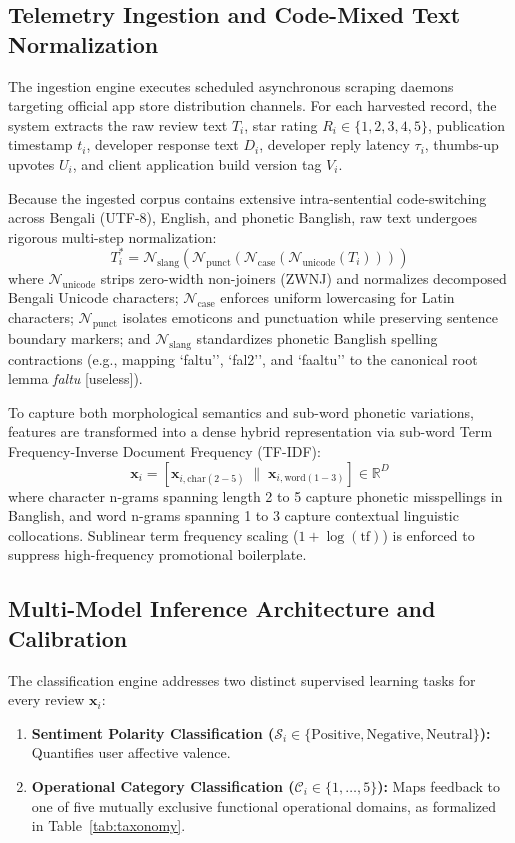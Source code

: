 \documentclass[5p,twocolumn,authoryear]{elsarticle}
\begin{document}
\subsection{Telemetry Ingestion and Code-Mixed Text Normalization}
The ingestion engine executes scheduled asynchronous scraping daemons targeting official app store distribution channels. For each harvested record, the system extracts the raw review text $T_i$, star rating $R_i \in \{1, 2, 3, 4, 5\}$, publication timestamp $t_i$, developer response text $D_i$, developer reply latency $\tau_i$, thumbs-up upvotes $U_i$, and client application build version tag $V_i$.

Because the ingested corpus contains extensive intra-sentential code-switching across Bengali (UTF-8), English, and phonetic Banglish, raw text undergoes rigorous multi-step normalization:
\begin{equation}
T_i^* = \mathcal{N}_{\text{slang}}\left(\mathcal{N}_{\text{punct}}\left(\mathcal{N}_{\text{case}}\left(\mathcal{N}_{\text{unicode}}(T_i)\right)\right)\right)
\end{equation}
where $\mathcal{N}_{\text{unicode}}$ strips zero-width non-joiners (ZWNJ) and normalizes decomposed Bengali Unicode characters; $\mathcal{N}_{\text{case}}$ enforces uniform lowercasing for Latin characters; $\mathcal{N}_{\text{punct}}$ isolates emoticons and punctuation while preserving sentence boundary markers; and $\mathcal{N}_{\text{slang}}$ standardizes phonetic Banglish spelling contractions (e.g., mapping `faltu'', `fal2'', and `faaltu'' to the canonical root lemma \textit{faltu} [useless]).

To capture both morphological semantics and sub-word phonetic variations, features are transformed into a dense hybrid representation via sub-word Term Frequency-Inverse Document Frequency (TF-IDF):
\begin{equation}
\mathbf{x}_i = \left[ \mathbf{x}_{i, \text{char}(2-5)} \;\|\; \mathbf{x}_{i, \text{word}(1-3)} \right] \in \mathbb{R}^D
\end{equation}
where character n-grams spanning length 2 to 5 capture phonetic misspellings in Banglish, and word n-grams spanning 1 to 3 capture contextual linguistic collocations. Sublinear term frequency scaling ($1 + \log(\text{tf})$) is enforced to suppress high-frequency promotional boilerplate.

\subsection{Multi-Model Inference Architecture and Calibration}
The classification engine addresses two distinct supervised learning tasks for every review $\mathbf{x}_i$:
\begin{enumerate}
    \item \textbf{Sentiment Polarity Classification ($\mathcal{S}_i \in \{\text{Positive}, \text{Negative}, \text{Neutral}\}$):} Quantifies user affective valence.
    \item \textbf{Operational Category Classification ($\mathcal{C}_i \in \{1, \dots, 5\}$):} Maps feedback to one of five mutually exclusive functional operational domains, as formalized in Table~\ref{tab:taxonomy}.
\end{enumerate}
\end{document}
